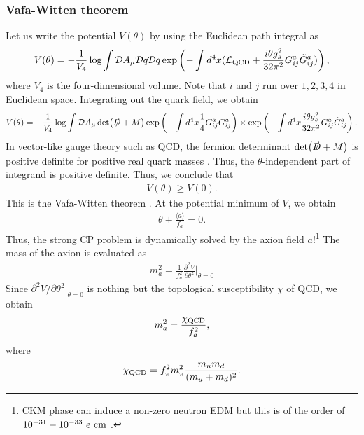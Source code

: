 \documentclass[11pt,a4paper]{article}
\begin{document}
\subsubsection{Vafa-Witten theorem}
Let us write the potential $V(\theta)$ by using the Euclidean path integral as
\begin{align}
    V(\theta) = -\frac{1}{V_4} \log \int {\cal D}A_\mu {\cal D}q {\cal D}\bar q \exp\left( -\int d^4 x ({\cal L}_{\rm QCD} + \frac{i \theta g_s^2}{32\pi^2} G_{ij}^a \tilde G_{ij}^a) \right),
\end{align}
where $V_4$ is the four-dimensional volume. Note that $i$ and $j$ run over $1,2,3,4$ in Euclidean space.
Integrating out the quark field, we obtain
\begin{align}
    V(\theta) = -\frac{1}{V_4}\log \int {\cal D}A_\mu \det(\slashed{D} + M) \exp\left( -\int d^4 x \frac{1}{4} G_{ij}^a G_{ij}^a \right) \times \exp\left( -\int d^4 x  \frac{i \theta g_s^2}{32\pi^2} G_{ij}^a \tilde G_{ij}^a \right).
\end{align}
In vector-like gauge theory such as QCD, the fermion determinant $\det(\slashed{D} + M)$ is positive definite for positive real quark masses \cite{Vafa:1983tf}. Thus, the $\theta$-independent part of integrand is positive definite. Thus, we conclude that
\begin{align}
    V(\theta) \geq V(0).
\end{align}
This is the Vafa-Witten theorem \cite{Vafa:1984xg}.
At the potential minimum of $V$, we obtain
\begin{align}
    \bar\theta + \frac{\langle a \rangle}{f_a} = 0.
\end{align}
Thus, the strong CP problem is dynamically solved by the axion field $a$!\footnote{
CKM phase can induce a non-zero neutron EDM but this is of the order of $10^{-31}-10^{-33}~e~{\rm cm}$ \cite{Georgi:1986kr}.}
The mass of the axion is evaluated as
\begin{align}
    m_a^2 = \frac{1}{f_a^2} \frac{\partial^2 V}{\partial \theta^2}\biggr|_{\theta=0}
\end{align}
Since $\partial^2 V/\partial \theta^2|_{\theta=0}$ is nothing but the topological susceptibility $\chi$ of QCD, we obtain
\begin{align}
    m_a^2 = \frac{\chi_{\rm QCD}}{f_a^2}, \label{eq:axion mass 1}
\end{align}
where
\begin{align}
    \chi_{\rm QCD} = f_\pi^2 m_\pi^2 \frac{m_u m_d}{(m_u + m_d)^2}.
\end{align}
\end{document}
